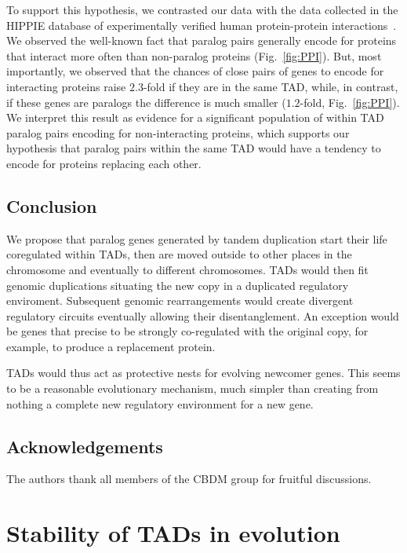 \documentclass[a4paper,twoside=true,openright,parskip=full,chapterprefix=true,11pt,headings=normal,bibliography=totoc,listof=totoc,titlepage=on,captions=tableabove,draft=false]{scrreprt}
\theoremstyle{definition}
\theoremstyle{definition}
\theoremstyle{definition}
\theoremstyle{remark}
\begin{document}
To support this hypothesis, we contrasted our data with the data
collected in the HIPPIE database of experimentally verified human
protein-protein interactions~\citep{Schaefer2012}. We observed the
well-known fact that paralog pairs generally encode for proteins that
interact more often than non-paralog proteins (Fig.~\ref{fig:PPI}). But,
most importantly, we observed that the chances of close pairs of genes
to encode for interacting proteins raise \(2.3\)-fold if they are in the
same TAD, while, in contrast, if these genes are paralogs the difference
is much smaller (\(1.2\)-fold, Fig.~\ref{fig:PPI}). We interpret this
result as evidence for a significant population of within TAD paralog
pairs encoding for non-interacting proteins, which supports our
hypothesis that paralog pairs within the same TAD would have a tendency
to encode for proteins replacing each other.

\hypertarget{conclusion}{%
\section{Conclusion}\label{conclusion}}

We propose that paralog genes generated by tandem duplication start
their life coregulated within TADs, then are moved outside to other
places in the chromosome and eventually to different chromosomes. TADs
would then fit genomic duplications situating the new copy in a
duplicated regulatory enviroment. Subsequent genomic rearrangements
would create divergent regulatory circuits eventually allowing their
disentanglement. An exception would be genes that precise to be strongly
co-regulated with the original copy, for example, to produce a
replacement protein.

TADs would thus act as protective nests for evolving newcomer genes.
This seems to be a reasonable evolutionary mechanism, much simpler than
creating from nothing a complete new regulatory environment for a new
gene.

\hypertarget{acknowledgements}{%
\section*{Acknowledgements}\label{acknowledgements}}

The authors thank all members of the CBDM group for fruitful
discussions.

\hypertarget{TAD-evolution}{%
\chapter{Stability of TADs in evolution}\label{TAD-evolution}}
\end{document}
